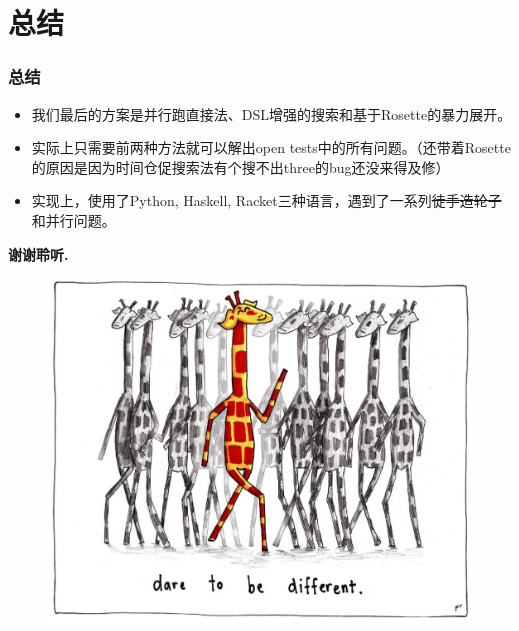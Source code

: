\documentclass[notheorems]{beamer} %
\begin{document}
  \section{总结}
  \begin{frame}
    \frametitle{总结}
    \begin{itemize}
      \item 我们最后的方案是并行跑直接法、DSL增强的搜索和基于Rosette的暴力展开。
      \item 实际上只需要前两种方法就可以解出open tests中的所有问题。（还带着Rosette的原因是因为时间仓促搜索法有个搜不出three的bug还没来得及修）
      \item 实现上，使用了Python, Haskell, Racket三种语言，遇到了一系列\sout{徒手造轮子}和并行问题。
    \end{itemize}
  \end{frame}

  \begin{frame}[plain]
    \addtocounter{framenumber}{-1}
    \begin{center}
      \Huge{\bf 谢谢聆听.}
    \end{center}
    \begin{figure}
      \centering
      \includegraphics[width=0.5\linewidth]{dbd.pdf}
    \end{figure}
  \end{frame}
  
  
  
\end{document}
